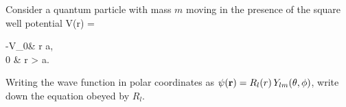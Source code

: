 \newcommand{\Vo}{V_0}
\newcommand{\vr}{\vb{r}}
\newcommand{\Rl}{R_l}
\newcommand{\Ylm}{Y_{l m}}
\newcommand{\Rlr}{\Rl(r)}
\newcommand{\vep}{\varepsilon}
\newcommand{\del}{\delta}
\newcommand{\dell}{\del_l}
\newcommand{\delo}{\del_0}
\newcommand{\Al}{A_l}
\newcommand{\Ao}{A_0}
\newcommand{\Bo}{B_0}
\newcommand{\absr}{\abs{r}}

\newcommand{\tsc}{\text{sc}}
\newcommand{\asc}{a_\tsc}
\newcommand{\kap}{\kappa}
\newcommand{\avep}{\abs{\vep}}

\newcommand{\betal}{\beta_l}
\newcommand{\psiE}{\psi_E}
\newcommand{\uE}{u_E}
\newcommand{\El}{E_l}
\newcommand{\eff}{\text{eff}}
\newcommand{\Veff}{V_\eff}

\newcommand{\jl}{j_l}
\newcommand{\jo}{j_0}
\newcommand{\nl}{n_l}
\newcommand{\no}{n_0}
\newcommand{\hlq}{h_l^{(1)}}
\newcommand{\hoq}{h_0^{(1)}}
\newcommand{\Ro}{R_0}
\newcommand{\betao}{\beta_0}
\newcommand{\constant}{\text{constant }}


\clearpage
\begin{statement}{}
	Consider a quantum particle with mass $m$ moving in the presence of the square well potential
	\beq
		V(r) = \begin{cases}
			-\Vo & r \leq a, \\
			0 & r > a.
		\end{cases}
	\eeq
	\vfix
\end{statement}

\begin{problem}
	Writing the wave function in polar coordinates as $\psi(\vr) = \Rlr \, \Ylm(\tht, \phi)$, write down the {\Schrodinger} equation obeyed by $\Rl$.
\end{problem}

